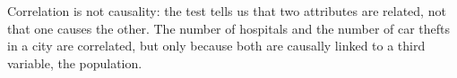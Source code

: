 \begin{remark}
    Correlation is not causality: the test tells us that two attributes are related, not that one causes the other. The number of hospitals and the number of car thefts in a city are correlated, but only because both are causally linked to a third variable, the population.
\end{remark}
